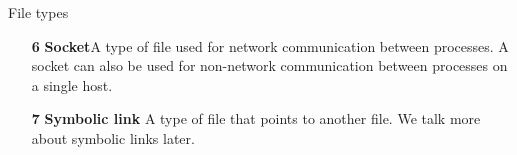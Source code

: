 \documentclass{beamer}
\begin{document}
  
  
 \begin{frame}[t]{File types} \vspace*{4pt}
\begin{enumerate}
	\item[\textbf{6}]\textbf{Socket}A type of file used for network communication between processes. A	socket can also be used for non-network communication between processes on a single host.
	\item[\textbf{7}]\textbf{Symbolic link} A type of file that points to another file. We talk more about
	symbolic links later.
\end{enumerate}




\end{frame}
  
  
  
\end{document}
